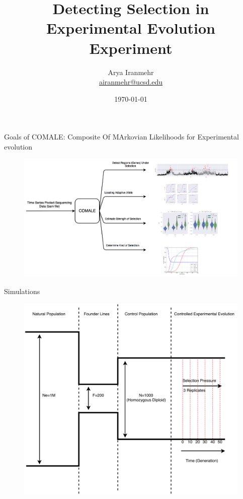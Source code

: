 \documentclass[t]{beamer} %
\title{Detecting Selection in Experimental Evolution Experiment}
\subtitle{}
\author[Arya Iranmehr]
	{%
		\texorpdfstring{
			\centering
			Arya Iranmehr\\
			\href{mailto:airanmehr@ucsd.edu}{airanmehr@ucsd.edu}
		}
		{Arya Iranmehr}
	}
\institute{
		Bafna Lab\\
		University of California, San Diego}
\date{
		\monthyeardate\today}
\begin{document}
	\begin{frame}
		\titlepage
	\end{frame}
	
	
	\begin{frame}{Goals of COMALE: Composite Of MArkovian Likelihoods for Experimental evolution}
\begin{figure}
\includegraphics[trim={0.05in 0.5in 1.5in 0in},clip,width=\textwidth]{../figures/goal}
\end{figure}
	\end{frame}
	
	\begin{frame}{Simulations}
		\begin{figure}
			\includegraphics[trim={0.05in 0.5in 0.5in 0in},clip,scale=0.22]{../figures/ControlledExperimentalEvolution}
		\end{figure}
	\end{frame}	
\end{document}
